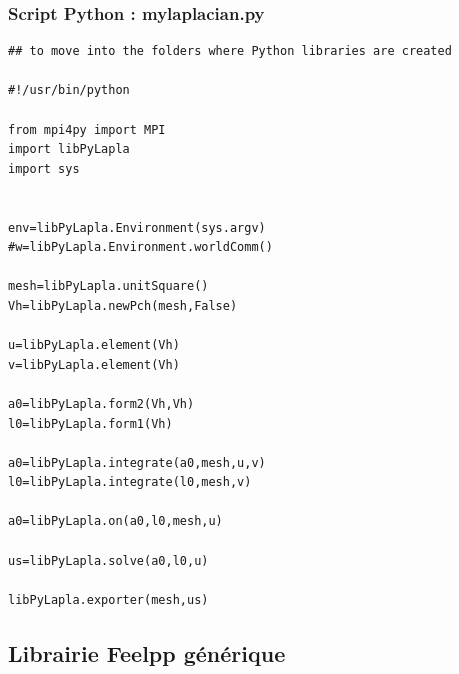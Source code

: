 \documentclass[french,12pt]{article}
\begin{document}
\subsubsection{Script Python : mylaplacian.py}
\begin{lstlisting}
## to move into the folders where Python libraries are created

#!/usr/bin/python

from mpi4py import MPI
import libPyLapla
import sys


env=libPyLapla.Environment(sys.argv)
#w=libPyLapla.Environment.worldComm()

mesh=libPyLapla.unitSquare()
Vh=libPyLapla.newPch(mesh,False)

u=libPyLapla.element(Vh)
v=libPyLapla.element(Vh)

a0=libPyLapla.form2(Vh,Vh)
l0=libPyLapla.form1(Vh)

a0=libPyLapla.integrate(a0,mesh,u,v)
l0=libPyLapla.integrate(l0,mesh,v)

a0=libPyLapla.on(a0,l0,mesh,u)

us=libPyLapla.solve(a0,l0,u)

libPyLapla.exporter(mesh,us)
\end{lstlisting}

\subsection{Librairie Feelpp générique}
\end{document}
